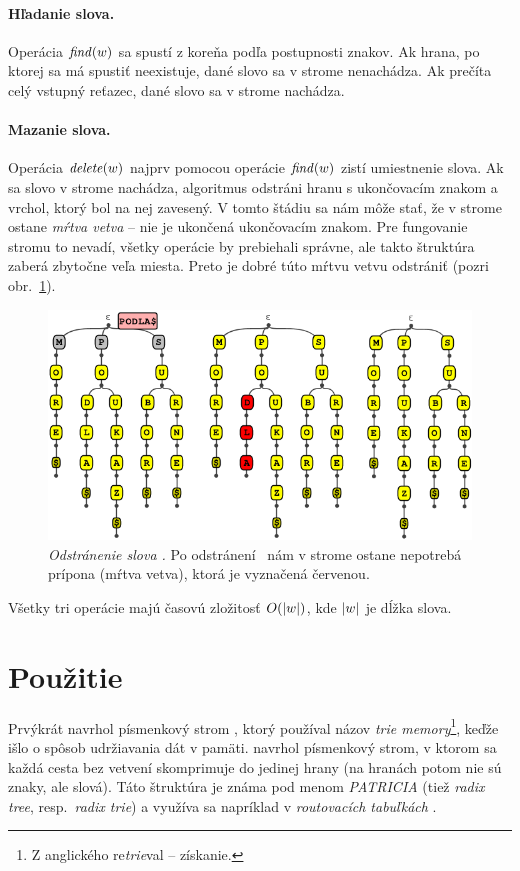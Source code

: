 \paragraph{Hľadanie slova.}%
Operácia $\mathop{\mathit{find}}(w)$ sa spustí z koreňa podľa postupnosti znakov. Ak hrana, 
po ktorej sa má spustiť neexistuje, dané slovo sa v strome nenachádza. 
Ak prečíta celý vstupný reťazec, dané slovo sa v strome nachádza.

\paragraph{Mazanie slova.}%
Operácia $\mathop{\mathit{delete}}(w)$ najprv pomocou operácie $\mathop{\mathit{find}}(w)$ zistí umiestnenie slova. 
Ak sa slovo v strome nachádza, algoritmus odstráni hranu s ukončovacím 
znakom a vrchol, ktorý bol na nej zavesený. V tomto štádiu sa nám môže 
stať, že v strome ostane \emph{mŕtva vetva} -- nie je ukončená 
ukončovacím znakom. Pre fungovanie stromu to nevadí, všetky operácie by 
prebiehali správne, ale takto štruktúra zaberá zbytočne veľa miesta. 
Preto je dobré túto mŕtvu vetvu odstrániť (pozri obr.~\ref{img:triedelete}).

\begin{figure}
\centering
\includegraphics[width=0.9\columnwidth]{obrazky/triedeletesmall.png}
\caption{\emph{Odstránenie slova .} Po odstránení 
\uz\ nám v strome ostane nepotrebá prípona  (mŕtva vetva), 
ktorá je vyznačená červenou.}
\label{img:triedelete} 
\end{figure}

Všetky tri operácie majú časovú 
zložitosť $O(|w|)$, kde $|w|$ je dĺžka slova.

\section{Použitie}\label{sec:trie:pouzitie}
Prvýkrát navrhol písmenkový strom \citet{fredkin}, ktorý používal názov 
\emph{trie memory}\footnote{Z anglického re\emph{trie}val -- získanie.}, 
keďže išlo o spôsob udržiavania dát v pamäti. 
\citet{patricia} navrhol písmenkový strom, v ktorom sa každá cesta bez vetvení
skomprimuje do jedinej hrany (na hranách potom nie sú znaky, ale slová).
Táto štruktúra je známa pod menom \emph{PATRICIA} (tiež \emph{radix tree},
resp.\ \emph{radix trie}) a využíva sa napríklad v \emph{routovacích tabuľkách}
\citep{radix}.

